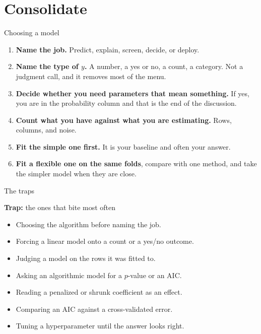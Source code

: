 \documentclass[aspectratio=169]{beamer}
\newenvironment{trap}[1]{\begin{alertblock}{\textbf{Trap:} #1}}{\end{alertblock}}
\begin{document}
\section{Consolidate}
\begin{frame}{Choosing a model}
\small
\begin{enumerate}
  \item \textbf{Name the job.} Predict, explain, screen, decide, or deploy.
  \item \textbf{Name the type of $y$.} A number, a yes or no, a count, a category. Not a judgment
        call, and it removes most of the menu.
  \item \textbf{Decide whether you need parameters that mean something.} If yes, you are in the
        probability column and that is the end of the discussion.
  \item \textbf{Count what you have against what you are estimating.} Rows, columns, and noise.
  \item \textbf{Fit the simple one first.} It is your baseline and often your answer.
  \item \textbf{Fit a flexible one on the same folds}, compare with one method, and take the
        simpler model when they are close.
\end{enumerate}
\end{frame}

\begin{frame}{The traps}
\begin{trap}{the ones that bite most often}
\begin{itemize}
  \item Choosing the algorithm before naming the job.
  \item Forcing a linear model onto a count or a yes/no outcome.
  \item Judging a model on the rows it was fitted to.
  \item Asking an algorithmic model for a $p$-value or an AIC.
  \item Reading a penalized or shrunk coefficient as an effect.
  \item Comparing an AIC against a cross-validated error.
  \item Tuning a hyperparameter until the answer looks right.
\end{itemize}
\end{trap}
\end{frame}
\end{document}
